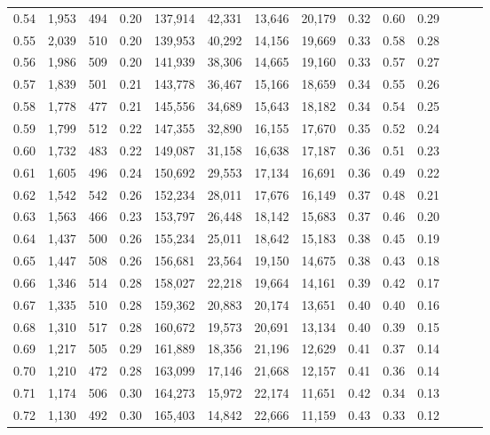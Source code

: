 \begin{tabular}{rrrrrrrrrrrrrr}
0.54 &  1,953 &  494 &  0.20 &  137,914 &   42,331 &  13,646 &  20,179 &  0.32 &  0.60 &      0.29 \\
0.55 &  2,039 &  510 &  0.20 &  139,953 &   40,292 &  14,156 &  19,669 &  0.33 &  0.58 &      0.28 \\
0.56 &  1,986 &  509 &  0.20 &  141,939 &   38,306 &  14,665 &  19,160 &  0.33 &  0.57 &      0.27 \\
0.57 &  1,839 &  501 &  0.21 &  143,778 &   36,467 &  15,166 &  18,659 &  0.34 &  0.55 &      0.26 \\
0.58 &  1,778 &  477 &  0.21 &  145,556 &   34,689 &  15,643 &  18,182 &  0.34 &  0.54 &      0.25 \\
0.59 &  1,799 &  512 &  0.22 &  147,355 &   32,890 &  16,155 &  17,670 &  0.35 &  0.52 &      0.24 \\
0.60 &  1,732 &  483 &  0.22 &  149,087 &   31,158 &  16,638 &  17,187 &  0.36 &  0.51 &      0.23 \\
0.61 &  1,605 &  496 &  0.24 &  150,692 &   29,553 &  17,134 &  16,691 &  0.36 &  0.49 &      0.22 \\
0.62 &  1,542 &  542 &  0.26 &  152,234 &   28,011 &  17,676 &  16,149 &  0.37 &  0.48 &      0.21 \\
0.63 &  1,563 &  466 &  0.23 &  153,797 &   26,448 &  18,142 &  15,683 &  0.37 &  0.46 &      0.20 \\
0.64 &  1,437 &  500 &  0.26 &  155,234 &   25,011 &  18,642 &  15,183 &  0.38 &  0.45 &      0.19 \\
0.65 &  1,447 &  508 &  0.26 &  156,681 &   23,564 &  19,150 &  14,675 &  0.38 &  0.43 &      0.18 \\
0.66 &  1,346 &  514 &  0.28 &  158,027 &   22,218 &  19,664 &  14,161 &  0.39 &  0.42 &      0.17 \\
0.67 &  1,335 &  510 &  0.28 &  159,362 &   20,883 &  20,174 &  13,651 &  0.40 &  0.40 &      0.16 \\
0.68 &  1,310 &  517 &  0.28 &  160,672 &   19,573 &  20,691 &  13,134 &  0.40 &  0.39 &      0.15 \\
0.69 &  1,217 &  505 &  0.29 &  161,889 &   18,356 &  21,196 &  12,629 &  0.41 &  0.37 &      0.14 \\
0.70 &  1,210 &  472 &  0.28 &  163,099 &   17,146 &  21,668 &  12,157 &  0.41 &  0.36 &      0.14 \\
0.71 &  1,174 &  506 &  0.30 &  164,273 &   15,972 &  22,174 &  11,651 &  0.42 &  0.34 &      0.13 \\
0.72 &  1,130 &  492 &  0.30 &  165,403 &   14,842 &  22,666 &  11,159 &  0.43 &  0.33 &      0.12 \\

\end{tabular}
